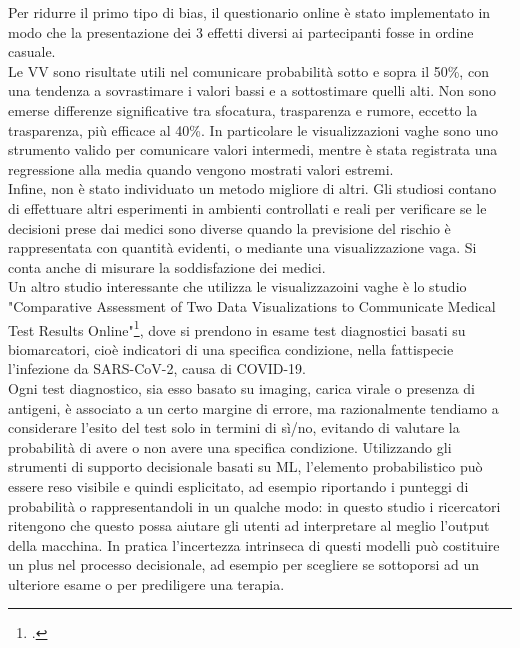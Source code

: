 Per ridurre il primo tipo di bias, il questionario online è stato implementato in modo che la presentazione dei 3 effetti diversi ai partecipanti fosse in ordine casuale.\\
Le VV sono risultate utili nel comunicare probabilità sotto e sopra il 50\%, con una tendenza a sovrastimare i valori bassi e a sottostimare quelli alti. Non sono emerse differenze significative tra sfocatura, trasparenza e rumore, eccetto la trasparenza, più efficace al 40\%.
In particolare le visualizzazioni vaghe sono uno strumento valido per comunicare valori intermedi, mentre è stata registrata una regressione alla media quando vengono mostrati valori estremi.\\
Infine, non è stato individuato un metodo migliore di altri. Gli studiosi contano di effettuare altri esperimenti in ambienti controllati e reali per verificare se le decisioni prese dai medici sono diverse quando la previsione del rischio è rappresentata con quantità evidenti, o mediante una visualizzazione vaga. Si conta anche di misurare la soddisfazione dei medici.\\

Un altro studio interessante che utilizza le visualizzazoini vaghe è lo studio "Comparative Assessment of Two Data Visualizations to Communicate Medical Test Results Online"\footcite{womak:comparative-assesment}, dove si prendono in esame test diagnostici basati su biomarcatori, cioè indicatori di una specifica condizione, nella fattispecie l'infezione da SARS-CoV-2, causa di COVID-19.\\

Ogni test diagnostico, sia esso basato su imaging, carica virale o presenza di antigeni, è associato a un certo margine di errore, ma razionalmente tendiamo a considerare l'esito del test solo in termini di sì/no, evitando di valutare la probabilità di avere o non avere una specifica condizione. Utilizzando gli strumenti di supporto decisionale basati su ML, l'elemento probabilistico può essere reso visibile e quindi esplicitato, ad esempio riportando i punteggi di probabilità o rappresentandoli in un qualche modo: in questo studio i ricercatori ritengono che questo possa aiutare gli utenti ad interpretare al meglio l'output della
macchina. In pratica l'incertezza intrinseca di questi modelli può costituire un plus nel processo decisionale, ad esempio per scegliere se sottoporsi ad un ulteriore esame o per prediligere una terapia.\\

